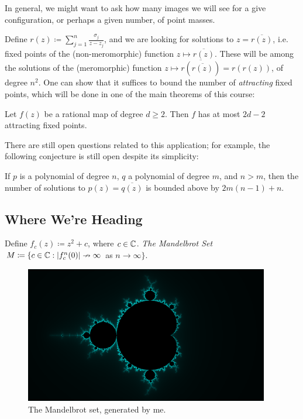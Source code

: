 \documentclass[10pt,a4paper]{article}
\begin{document}
In general, we might want to ask how many images we will see for a give configuration, or perhaps a given number, of point masses.

Define $r(z) \coloneqq \sum_{j=1}^n \frac{\sigma_j}{z-z_j}$, and we are looking for solutions to $z = \overline{r(z)}$, i.e. fixed points of the (non-meromorphic) function $z \mapsto \overline{r(z)}$. These will be among the solutions of the (meromorphic) function $z\mapsto \overline{r(\overline{r(z)})} = r(r(z))$, of degree $n^2$. One can show that it suffices to bound the number of \emph{attracting} fixed points, which will be done in one of the main theorems of this course:

\begin{theorem}
Let $f(z)$ be a rational map of degree $d \geq 2$. Then $f$ has at most $2d-2$ attracting fixed points.
\end{theorem}

There are still open questions related to this application; for example, the following conjecture is still open despite its simplicity:
\begin{conjecture}
If $p$ is a polynomial of degree $n$, $q$ a polynomial of degree $m$, and $n>m$, then the number of solutions to $p(z) = \overline{q(z)}$ is bounded above by $2m(n-1)+n$.
\end{conjecture}

\subsection{Where We're Heading}
Define $f_c(z) \coloneqq z^2+c$, where $c \in \mathbb{C}$. \emph{The Mandelbrot Set} $M \coloneqq \{c \in \mathbb{C} : |f_c^n(0)|\nrightarrow\infty$ as $n\to\infty\}$.
\begin{figure}[H]
  \centering
  \includegraphics[width=0.95\textwidth]{compdyn05.png}
  \caption{The Mandelbrot set, generated by me.}
\end{figure}
\end{document}
